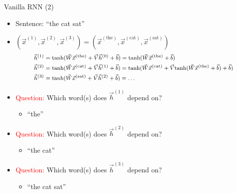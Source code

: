 \begin{vbframe}{Vanilla RNN (2)}

\vfill

	\begin{itemize}
		\item Sentence: ``the cat sat''
		\item $(\vec x^{(1)}, \vec x^{(2)}, \vec x^{(3)}) = (\vec x^{(\text{the})}, \vec x^{(\text{cat})}, \vec x^{(\text{sat})})$
			$$
			\footnotesize
			\begin{aligned}
				\vec h^{(1)} & = \mathrm{tanh}(\vec W \vec x^{(\text{the})} + \vec V \vec h^{(0)} + \vec b) = \mathrm{tanh}(\vec W \vec x^{(\text{the})} + \vec b) \\
				\vec h^{(2)} & = \mathrm{tanh}(\vec W \vec x^{(\text{cat})} + \vec V \vec h^{(1)}+ \vec b) = \mathrm{tanh}(\vec W \vec x^{(\text{cat})} + \vec V \mathrm{tanh}(\vec W \vec x^{(\text{the})} + \vec b) + \vec b) \\
				\vec h^{(3)} & = \mathrm{tanh}(\vec W \vec x^{(\text{sat})} + \vec V \vec h^{(2)} + \vec b) = \ldots
			\end{aligned}
			$$
		\item \textcolor{red}{Question:} Which word(s) does $\vec h^{(1)}$ depend on?
			\begin{itemize}
					\item ``the''
			\end{itemize}
		\item \textcolor{red}{Question:} Which word(s) does $\vec h^{(2)}$ depend on?
			\begin{itemize}
					\item ``the cat''
			\end{itemize}
		\item \textcolor{red}{Question:} Which word(s) does $\vec h^{(3)}$ depend on?
			\begin{itemize}
					\item ``the cat sat''
			\end{itemize}
	\end{itemize}

\vfill

\end{vbframe}


